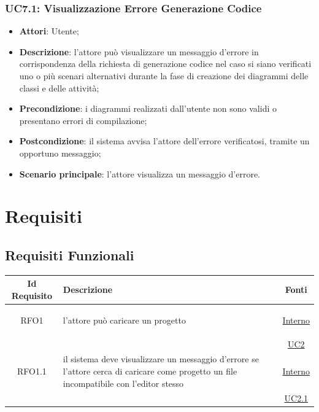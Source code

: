 \begin{itemize}
\begin{itemize}
\begin{itemize}
\begin{itemize}
\subsubsection{UC7.1: Visualizzazione Errore Generazione Codice}
\label{UC7.1}
\begin{itemize}
	\item \textbf{Attori}: Utente;
	\item \textbf{Descrizione}: l'attore può visualizzare un messaggio d'errore in corrispondenza della richiesta di generazione codice nel caso si siano verificati uno o più scenari alternativi durante la fase di creazione dei diagrammi delle classi e delle attività;
	\item \textbf{Precondizione}: i diagrammi realizzati dall'utente non sono validi o presentano errori di compilazione;%
	\item \textbf{Postcondizione}: il sistema avvisa l'attore dell'errore verificatosi, tramite un opportuno messaggio;
	\item \textbf{Scenario principale}: l'attore visualizza un messaggio d'errore.
\end{itemize}




\section{Requisiti}

\subsection{Requisiti Funzionali}
\normalsize
\begin{longtable}{|c|>{\centering}m{7cm}|c|}
\hline
\textbf{Id Requisito} & \textbf{Descrizione} & \textbf{Fonti}\\
\hline
\endhead
\hypertarget{RFO1}{RFO1} & l'attore può caricare un progetto &  \hyperlink{Interno}{Interno}\\
& & \hyperref[UC2]{UC2}\\ \hline

\hypertarget{RFO1.1}{RFO1.1} & il sistema deve visualizzare un messaggio d'errore se l'attore cerca di caricare come progetto un file incompatibile con l'editor stesso &  \hyperlink{Interno}{Interno}\\
& & \hyperref[UC2.1]{UC2.1}\\ \hline


\end{longtable}
\end{itemize}
\end{itemize}
\end{itemize}
\end{itemize}
